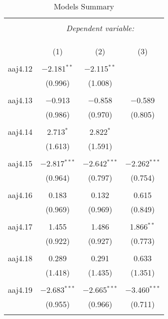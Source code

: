 
\begin{table}[!htbp] \centering 
  \caption{Models Summary} 
  \label{} 
\begin{tabular}{@{\extracolsep{5pt}}lccc} 
\\[-1.8ex]\hline 
\hline \\[-1.8ex] 
 & \multicolumn{3}{c}{\textit{Dependent variable:}} \\ 
\cline{2-4} 
\\[-1.8ex] & \multicolumn{3}{c}{ } \\ 
\\[-1.8ex] & (1) & (2) & (3)\\ 
\hline \\[-1.8ex] 
 aaj4.12 & $-$2.181$^{**}$ & $-$2.115$^{**}$ &  \\ 
  & (0.996) & (1.008) &  \\ 
  & & & \\ 
 aaj4.13 & $-$0.913 & $-$0.858 & $-$0.589 \\ 
  & (0.986) & (0.970) & (0.805) \\ 
  & & & \\ 
 aaj4.14 & 2.713$^{*}$ & 2.822$^{*}$ &  \\ 
  & (1.613) & (1.591) &  \\ 
  & & & \\ 
 aaj4.15 & $-$2.817$^{***}$ & $-$2.642$^{***}$ & $-$2.262$^{***}$ \\ 
  & (0.964) & (0.797) & (0.754) \\ 
  & & & \\ 
 aaj4.16 & 0.183 & 0.132 & 0.615 \\ 
  & (0.969) & (0.969) & (0.849) \\ 
  & & & \\ 
 aaj4.17 & 1.455 & 1.486 & 1.866$^{**}$ \\ 
  & (0.922) & (0.927) & (0.773) \\ 
  & & & \\ 
 aaj4.18 & 0.289 & 0.291 & 0.633 \\ 
  & (1.418) & (1.435) & (1.351) \\ 
  & & & \\ 
 aaj4.19 & $-$2.683$^{***}$ & $-$2.665$^{***}$ & $-$3.460$^{***}$ \\ 
  & (0.955) & (0.966) & (0.711) \\ 
  & & & \\ 

\end{tabular}
\end{table}
